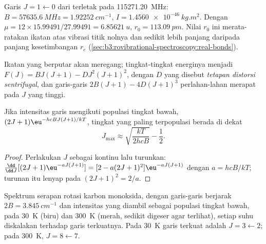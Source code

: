 \begin{example}\label{ex:b3:rovibrational-spectroscopy:co}
Garis $J = 1 \leftarrow 0$ dari  terletak pada
\qty{115271.20}{MHz}: $B = \qty{57635.6}{MHz} = \qty{1.92252}{cm^{-1}}$,
$I = \qty{1.4560e-46}{kg.m^2}$. Dengan $\mu = 12 \times 15.99491/27.99491 = \qty{6.85621}{u}$,
$r_0 = \qty{113.09}{pm}$. Nilai $r_0$ ini merata-ratakan ikatan atas vibrasi
titik nolnya dan sedikit lebih panjang daripada panjang kesetimbangan $r_e$
(\cref{sec:b3:rovibrational-spectroscopy:real-bonds}).
\end{example}

\begin{definition}\label{def:b3:rovibrational-spectroscopy:centrifugal}
Ikatan yang berputar akan meregang; tingkat-tingkat energinya menjadi
$F(J) = BJ(J+1) - DJ^2(J+1)^2$, dengan $D$ yang disebut \emph{tetapan distorsi
sentrifugal}, dan garis-garis
$2B(J+1) - 4D(J+1)^3$ perlahan-lahan merapat pada $J$ yang tinggi.
\end{definition}

\begin{proposition}\label{prop:b3:rovibrational-spectroscopy:jmax}
Jika intensitas garis mengikuti populasi tingkat bawah, $(2J+1)
\eu^{-hcBJ(J+1)/kT}$, tingkat yang paling terpopulasi berada di dekat
\[
J_{\max} \approx \sqrt{\frac{kT}{2hcB}} - \frac12.
\]
\end{proposition}

\begin{proof}
Perlakukan $J$ sebagai kontinu lalu turunkan: $\frac{\dd}{\dd J}[(2J+1)\eu^{-aJ(J+1)}]
= [2 - a(2J+1)^2]\eu^{-aJ(J+1)}$ dengan $a = hcB/kT$; turunan itu lenyap pada
$(2J + 1)^2 =
2/a$.
\end{proof}

\begin{omfigure}

{\small Spektrum serapan rotasi karbon monoksida, dengan garis-garis berjarak
$2B = \qty{3.845}{cm^{-1}}$ dan intensitas yang diambil sebagai populasi
tingkat bawah, pada \qty{30}{K} (biru) dan \qty{300}{K} (merah, sedikit
digeser agar terlihat), setiap suhu diskalakan terhadap garis terkuatnya. Pada
\qty{30}{K} garis terkuat adalah $J = 3 \leftarrow 2$; pada \qty{300}{K},
$J = 8 \leftarrow 7$.}
\end{omfigure}

